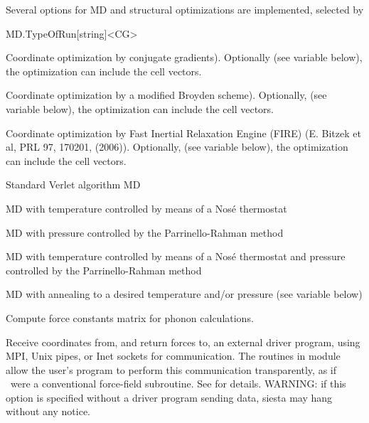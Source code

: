Several options for MD and structural optimizations are
implemented, selected by
\begin{fdfentry}{MD.TypeOfRun}[string]<CG>

  \begin{fdfoptions}
    
    \option[CG]%

    Coordinate optimization by conjugate gradients). Optionally (see
    variable  below), the optimization can include the
    cell vectors.

    \option[Broyden]%
    Coordinate optimization by a modified Broyden scheme). Optionally,
    (see variable  below), the optimization can
    include the cell vectors.

    \option[FIRE]%
    Coordinate optimization by Fast Inertial Relaxation Engine (FIRE)
    (E. Bitzek et al, PRL 97, 170201, (2006)).  Optionally, (see
    variable  below), the optimization can
    include the cell vectors.

    \option[Verlet]%
    Standard Verlet algorithm MD

    \option[Nose]%
    MD with temperature controlled  by means of a Nos\'e
    thermostat

    \option[ParrinelloRahman]%
    MD with pressure controlled by the Parrinello-Rahman method

    \option[NoseParrinelloRahman]%
    MD with temperature controlled by means of a Nos\'e thermostat and
    pressure controlled by the Parrinello-Rahman method

    \option[Anneal]%
    MD with annealing to a desired temperature and/or pressure (see
    variable  below)

    \option[FC]%
    Compute force constants matrix for
    phonon calculations.

    Receive coordinates from, and return forces to, an external
    driver program, using MPI, Unix pipes, or Inet sockets for
    communication. The routines in module  allow the
    user's program to perform this communication transparently, as if
    \siesta\ were a conventional force-field subroutine. See
     for details. WARNING: if this
    option is specified without a driver program sending data, siesta
    may hang without any notice.
    

\end{fdfoptions}
\end{fdfentry}
